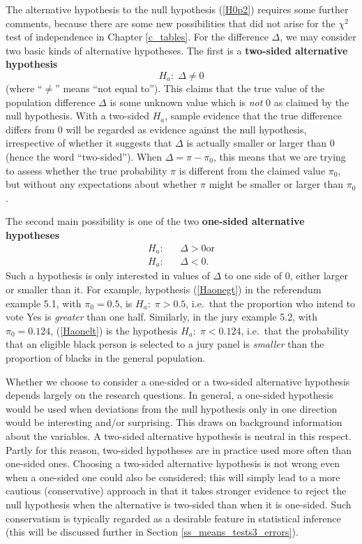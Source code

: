 The alternative hypothesis to the null hypothesis (\ref{H0p2}) requires
some further comments, because there are some new possibilities that did
not arise for the $\chi^{2}$ test of independence in Chapter
\ref{c_tables}.
For the difference $\Delta$, we may consider two basic kinds of
alternative hypotheses. The first is a \textbf{two-sided alternative
hypothesis}
\begin{equation}
H_{a}: \; \Delta\ne 0
\label{Hatwo}
\end{equation}
(where ``$\ne$'' means ``not equal to''). This claims that the true
value of the population difference $\Delta$ is some unknown value which
is \emph{not} 0 as claimed by the null hypothesis. With a two-sided
$H_{a}$, sample evidence that the true difference differs from 0 will be
regarded as evidence against the null hypothesis, irrespective of
whether it suggests that $\Delta$ is actually smaller or larger than 0
(hence the word ``two-sided''). When $\Delta=\pi-\pi_{0}$, this means
that we are trying to assess whether the true probability $\pi$ is
different from the claimed value $\pi_{0}$, but without any expectations
about whether $\pi$ might be smaller or larger than $\pi_{0}$.

The second main possibility is one of the two
\textbf{one-sided alternative hypotheses}
\begin{eqnarray}
H_{a}:&&  \Delta> 0 \text{or}
\label{Haonegt}
\\
H_{a}:&&  \Delta < 0.
\label{Haonelt}
\end{eqnarray}
Such a hypothesis is only interested in values of $\Delta$ to one side
of 0, either larger or smaller than it. For example, hypothesis
(\ref{Haonegt}) in the referendum example 5.1, with $\pi_{0}=0.5$, is
$H_{a}:\; \pi>0.5$, i.e.\ that the proportion who intend to
vote Yes is \emph{greater} than one half. Similarly, in the jury example
5.2, with $\pi_{0}=0.124$, (\ref{Haonelt}) is the hypothesis
$H_{a}:\; \pi<0.124$, i.e.\ that the probability that an eligible black
person is selected to a jury panel is \emph{smaller} than the proportion
of blacks in the general population.

Whether we choose to consider a one-sided or a two-sided alternative
hypothesis depends largely on the research questions. In general, a
one-sided hypothesis would be used when deviations from the null
hypothesis only in one direction would be interesting and/or surprising.
This draws on background information about the
variables. A two-sided alternative hypothesis is
neutral in this respect. Partly for this reason, two-sided
hypotheses are in practice used more often than one-sided ones.
Choosing a two-sided alternative
hypothesis is not wrong even when a one-sided one could also be
considered; this will simply lead to a more cautious
(conservative) approach in that it takes stronger evidence to reject the
null hypothesis when the alternative is two-sided than when it is
one-sided. Such conservatism is typically regarded as a desirable
feature in statistical inference (this will be discussed further in
Section \ref{ss_means_tests3_errors}).

